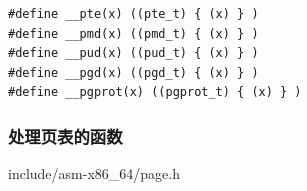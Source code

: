 \documentclass[xcolor=svgnames]{beamer}
\begin{document}
\begin{CJK*}{UTF8}{gbsn}
{\begin{lstlisting}[tabsize=8,basicstyle=\ttfamily]
#define __pte(x) ((pte_t) { (x) } )
#define __pmd(x) ((pmd_t) { (x) } )
#define __pud(x) ((pud_t) { (x) } )
#define __pgd(x) ((pgd_t) { (x) } )
#define __pgprot(x) ((pgprot_t) { (x) } )
\end{lstlisting}
}
\begin{frame}[fragile]
\frametitle{处理页表的函数}
\begin{block}{include/asm-x86\_64/page.h}
\lstconversions
\end{block}
\end{frame}

%

\end{CJK*}
\end{document}
